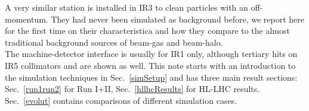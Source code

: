 A very similar station is installed in IR3 to clean particles with an off-momentum. They had never been simulated as background before, we report here for the first time on their characteristica and how they compare to the almost traditional background sources of beam-gas and beam-halo. \\

The machine-detector interface is usually for IR1 only, although tertiary hits on IR5 collimators and are shown as well. 
This note starts with an introduction to the simulation techniques in Sec.~\ref{simSetup} and has three main result sections: Sec.~\ref{run1run2} for Run I+II, Sec.~\ref{hllhcResults} for HL-LHC results. Sec.~\ref{evolut} contains comparisons of different simulation cases. 






